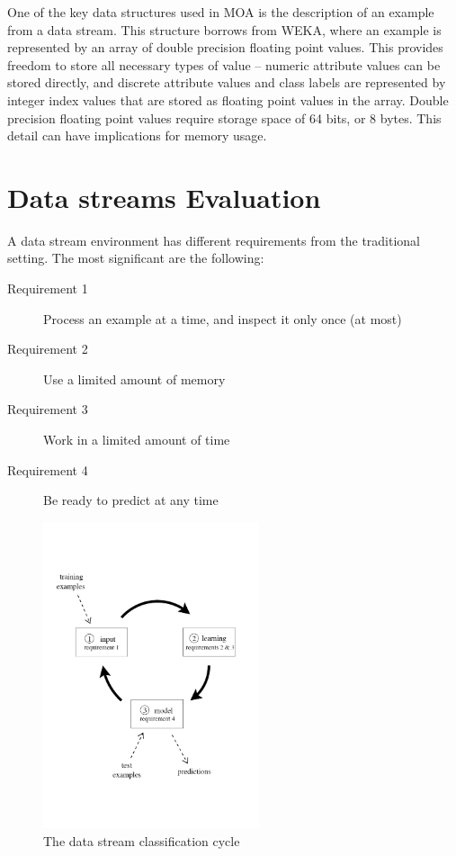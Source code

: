 \documentclass[a4paper,12pt,twoside]{book}
\begin{document}
    One of the key data structures used in MOA is the description of an example
from a data stream. This structure borrows from WEKA, where an example is
represented by an array of double precision floating point values. This provides
freedom to store all necessary types of value \--- numeric attribute values can be
stored directly, and discrete attribute values and class labels are represented
by integer index values that are stored as floating point values in the array.
Double precision floating point values require storage space of 64 bits, or 8
bytes. This detail can have implications for memory usage. %

\section{Data streams Evaluation}
A data stream environment has different requirements from the traditional 
setting. The most significant are the following: 
\begin{description}
\item[Requirement 1] Process an example at a time, and inspect
 it only once (at most)
\item[Requirement 2] Use a limited amount of memory
\item[Requirement 3] Work in a limited amount of time
\item[Requirement 4] Be ready to predict at any time
\end{description}
\begin{figure}[t]
\begin{center} 
\includegraphics[height=9cm]{figures/Frame.pdf}
\end{center} 
\caption{The data stream classification cycle}
\label{fig:cycle}
\end{figure} 
\end{document}
